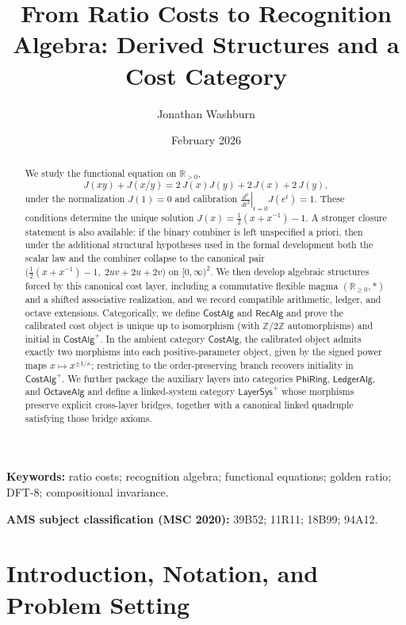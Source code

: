 \documentclass[11pt,reqno]{amsart}
\title[From Ratio Costs to Recognition Algebra]{From Ratio Costs to Recognition Algebra: Derived Structures and a Cost Category}
\author{Jonathan Washburn}
\date{February 2026}
\theoremstyle{plain}
\theoremstyle{definition}
\theoremstyle{remark}
\newcommand{\Jcost}{J}
\newcommand{\RR}{\mathbb{R}}
\newcommand{\ZZ}{\mathbb{Z}}
\newcommand{\1}{\mathbf{1}}
\newcommand{\paperadd}[1]{{\color{paperblue}#1}}
\begin{document}
\begin{abstract}
We study the functional equation on $\RR_{>0}$,
\[
\Jcost(xy)+\Jcost(x/y)=2\,\Jcost(x)\Jcost(y)+2\,\Jcost(x)+2\,\Jcost(y),
\]
under the normalization $\Jcost(1)=0$ and calibration
$\left.\frac{d^2}{dt^2}\right|_{t=0}\Jcost(e^t)=1$.
These conditions determine the unique solution
$\Jcost(x)=\tfrac12(x+x^{-1})-1$.
\paperadd{A stronger closure statement is also available: if the binary combiner is left unspecified a priori, then under the additional structural hypotheses used in the formal development both the scalar law and the combiner collapse to the canonical pair \(\bigl(\tfrac12(x+x^{-1})-1,\;2uv+2u+2v\bigr)\) on \([0,\infty)^2\).}
We then develop algebraic structures forced by this canonical cost layer, including a commutative flexible magma
$(\RR_{\ge0},\ast)$ and a shifted associative realization, and we record compatible arithmetic, ledger, and octave extensions.
Categorically, we define $\mathsf{CostAlg}$ and $\mathsf{RecAlg}$ and prove the calibrated cost object is unique up to isomorphism
(with $\ZZ/2\ZZ$ automorphisms) and initial in $\mathsf{CostAlg}^{+}$.
\paperadd{In the ambient category $\mathsf{CostAlg}$, the calibrated object admits exactly two morphisms into each positive-parameter object, given by the signed power maps \(x\mapsto x^{\pm 1/\kappa}\); restricting to the order-preserving branch recovers initiality in $\mathsf{CostAlg}^{+}$.}
We further package the auxiliary layers into categories $\mathsf{PhiRing}$, $\mathsf{LedgerAlg}$, and $\mathsf{OctaveAlg}$
and define a linked-system category $\mathsf{LayerSys}^{+}$ whose morphisms preserve explicit cross-layer bridges\paperadd{, together with a canonical linked quadruple satisfying those bridge axioms}.
\end{abstract}

\maketitle
\noindent\textbf{Keywords:} ratio costs; recognition algebra; functional equations; golden ratio; DFT-8; compositional invariance.

\noindent\textbf{AMS subject classification (MSC 2020):} 39B52; 11R11; 18B99; 94A12.







\section{Introduction, Notation, and Problem Setting}\label{sec:intro}
\end{document}
